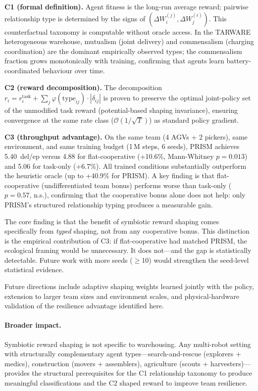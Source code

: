 \documentclass[Afour,sageh,times]{sagej}
\begin{document}
\textbf{C1 (formal definition).} Agent fitness is the long-run average reward; pairwise relationship type is determined by the signs of $(\Delta W_i^{(j)}, \Delta W_j^{(i)})$. This counterfactual taxonomy is computable without oracle access. In the TARWARE heterogeneous warehouse, mutualism (joint delivery) and commensalism (charging coordination) are the dominant empirically observed types; the commensalism fraction grows monotonically with training, confirming that agents learn battery-coordinated behaviour over time.

\textbf{C2 (reward decomposition).} The decomposition $r_i = r_i^{\mathrm{task}} + \sum_j \varphi(\mathrm{type}_{ij}) \cdot |\delta_{ij}|$ is proven to preserve the optimal joint-policy set of the unmodified task reward (potential-based shaping invariance), ensuring convergence at the same rate class ($\mathcal{O}(1/\sqrt{T})$) as standard policy gradient.

\textbf{C3 (throughput advantage).} On the same team (4 AGVs + 2 pickers), same environment, and same training budget (1\,M steps, 6 seeds), PRISM achieves 5.40~del/ep versus 4.88 for flat-cooperative (+10.6\%, Mann-Whitney $p{=}0.013$) and 5.06 for task-only (+6.7\%). All trained conditions substantially outperform the heuristic oracle (up to +40.9\% for PRISM). A key finding is that flat-cooperative (undifferentiated team bonus) performs worse than task-only ($p{=}0.57$, n.s.), confirming that the cooperative bonus alone does not help: only PRISM's structured relationship typing produces a measurable gain.

The core finding is that the benefit of symbiotic reward shaping comes specifically from \emph{typed} shaping, not from any cooperative bonus. This distinction is the empirical contribution of C3: if flat-cooperative had matched PRISM, the ecological framing would be unnecessary. It does not---and the gap is statistically detectable. Future work with more seeds (${\geq}$10) would strengthen the seed-level statistical evidence.

Future directions include adaptive shaping weights learned jointly with the policy, extension to larger team sizes and environment scales, and physical-hardware validation of the resilience advantage identified here.

\paragraph{Broader impact.} Symbiotic reward shaping is not specific to warehousing. Any multi-robot setting with structurally complementary agent types---search-and-rescue (explorers + medics), construction (movers + assemblers), agriculture (scouts + harvesters)---provides the structural prerequisites for the C1 relationship taxonomy to produce meaningful classifications and the C2 shaped reward to improve team resilience.
\end{document}
